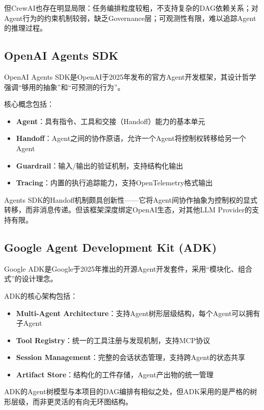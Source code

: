 \documentclass[12pt,a4paper]{ctexrep}
\begin{document}
但CrewAI也存在明显局限：任务编排粒度较粗，不支持复杂的DAG依赖关系；对Agent行为的约束机制较弱，缺乏Governance层；可观测性有限，难以追踪Agent的推理过程。

\subsection{OpenAI Agents SDK}

OpenAI Agents SDK\cite{openaiagentssdk2025}是OpenAI于2025年发布的官方Agent开发框架，其设计哲学强调``够用的抽象''和``可预测的行为''。

核心概念包括：

\begin{itemize}[leftmargin=2em]
\item \textbf{Agent}：具有指令、工具和交接（Handoff）能力的基本单元
\item \textbf{Handoff}：Agent之间的协作原语，允许一个Agent将控制权转移给另一个Agent
\item \textbf{Guardrail}：输入/输出的验证机制，支持结构化输出
\item \textbf{Tracing}：内置的执行追踪能力，支持OpenTelemetry格式输出
\end{itemize}

Agents SDK的Handoff机制颇具创新性——它将Agent间协作抽象为控制权的显式转移，而非消息传递。但该框架深度绑定OpenAI生态，对其他LLM Provider的支持有限。

\subsection{Google Agent Development Kit (ADK)}

Google ADK\cite{googleadk2025}是Google于2025年推出的开源Agent开发套件，采用``模块化、组合式''的设计理念。

ADK的核心架构包括：

\begin{itemize}[leftmargin=2em]
\item \textbf{Multi-Agent Architecture}：支持Agent树形层级结构，每个Agent可以拥有子Agent
\item \textbf{Tool Registry}：统一的工具注册与发现机制，支持MCP协议
\item \textbf{Session Management}：完整的会话状态管理，支持跨Agent的状态共享
\item \textbf{Artifact Store}：结构化的工件存储，Agent产出物的统一管理
\end{itemize}

ADK的Agent树模型与本项目的DAG编排有相似之处，但ADK采用的是严格的树形层级，而非更灵活的有向无环图结构。
\end{document}
